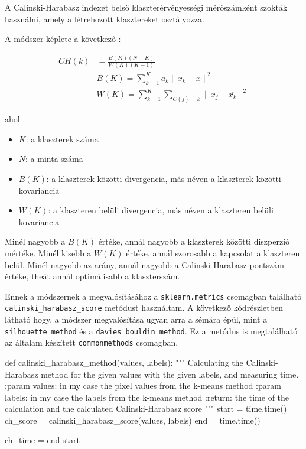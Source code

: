 A Calinski-Harabasz indexet belső klaszterérvényességi mérőszámként szokták használni, amely a létrehozott klasztereket osztályozza.

A módszer képlete a következő \cite{silhouette_calinski}:

\begin{equation*}
\begin{split} \label{}
 CH(k) & =\frac{B(K)(N-K)}{W(K)(K-1)} \\
 & B(K)=\sum_{k=1}^{K}a_k \|\overline{x_k}-\overline{x}\|^2 \\
 & W(K)=\sum_{k=1}^{K}\sum_{C(j)=k}\|x_j-\overline{x_k}\|^2
\end{split}
\end{equation*}

ahol
\begin{itemize}
\item $K$: a klaszterek száma
\item $N$: a minta száma
\item $B(K)$: a klaszterek közötti divergencia, más néven a klaszterek közötti kovariancia
\item $W(K)$: a klaszteren belüli divergencia, más néven a klaszteren belüli kovariancia
\end{itemize}

Minél nagyobb a $B(K)$ értéke, annál nagyobb a klaszterek közötti diszperzió mértéke. Minél kisebb a $W(K)$ értéke, annál szorosabb a kapcsolat a klaszteren belül. Minél nagyobb az arány, annál nagyobb a Calinski-Harabasz pontszám értéke, theát annál optimálisabb a klaszterszám.

Ennek a módszernek a megvalósításához a \texttt{sklearn.metrics} csomagban található \texttt{calinski\_harabasz\_score} metódust használtam. A következő kódrészletben látható hogy, a módszer megvalósítása ugyan arra a sémára épül, mint a \texttt{silhouette\_method} és a \texttt{davies\_bouldin\_method}. Ez a metódus is megtalálható az általam készített \texttt{commonmethods} csomagban.
\begin{python}
def calinski_harabasz_method(values, labels):
    """
    Calculating the Calinski-Harabasz method for the given values with
    the given labels, and measuring time.
    :param values: in my case the pixel values from the k-means method
    :param labels: in my case the labels from the k-means method
    :return: the time of the calculation and
        the calculated Calinski-Harabasz score
    """
    start = time.time()
    ch_score = calinski_harabasz_score(values, labels)
    end = time.time()

    ch_time = end-start
\end{python}

